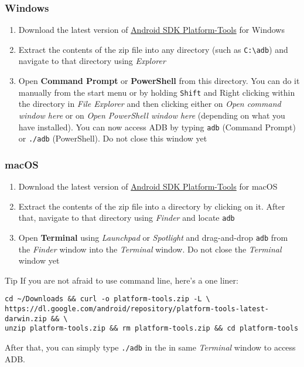\subsubsection{Windows} %
\begin{enumerate}
    \item Download the latest version of
    \href{https://dl.google.com/android/repository/platform-tools-latest-windows.zip}{Android SDK Platform-Tools} for
    Windows
    \item Extract the contents of the zip file into any directory (such as \texttt{C:\textbackslash{adb}}) and navigate
    to that directory using \textit{Explorer}
    \item Open \textbf{Command Prompt} or \textbf{PowerShell} from this directory. You can do it manually from the start
    menu or by holding \texttt{Shift} and Right clicking within the directory in \textit{File Explorer} and then
    clicking either on \textit{Open command window here} or on \textit{Open PowerShell window here} (depending on
    what you have installed). You can now access ADB by typing \texttt{adb} (Command Prompt) or \texttt{./adb}
    (PowerShell). Do not close this window yet
\end{enumerate}

\subsubsection{macOS} %
\begin{enumerate}
    \item Download the latest version of
    \href{https://dl.google.com/android/repository/platform-tools-latest-darwin.zip}{Android SDK Platform-Tools} for
    macOS
    \item Extract the contents of the zip file into a directory by clicking on it. After that, navigate to that
    directory using \textit{Finder} and locate \texttt{adb}
    \item Open \textbf{Terminal} using \textit{Launchpad} or \textit{Spotlight} and drag-and-drop \texttt{adb} from the
    \textit{Finder} window into the \textit{Terminal} window. Do not close the \textit{Terminal} window yet
\end{enumerate}

\begin{tip}{Tip}
    If you are not afraid to use command line, here's a one liner:
    \begin{verbatim}
cd ~/Downloads && curl -o platform-tools.zip -L \
https://dl.google.com/android/repository/platform-tools-latest-darwin.zip && \
unzip platform-tools.zip && rm platform-tools.zip && cd platform-tools
    \end{verbatim}
    After that, you can simply type \texttt{./adb} in the in same \textit{Terminal} window to access ADB\@.
\end{tip}


